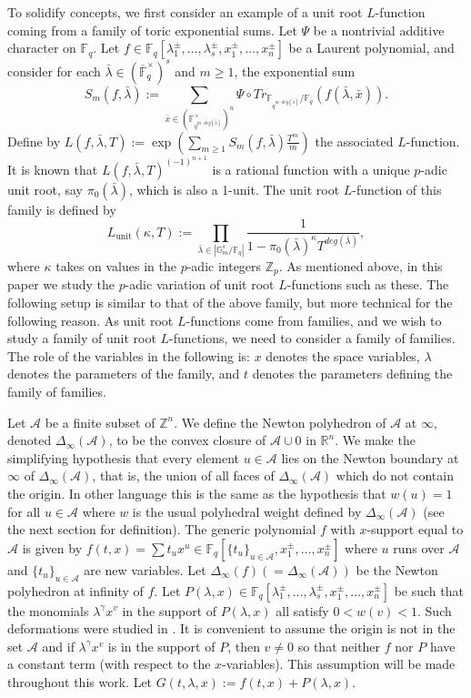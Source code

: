 \documentclass{article}
\theoremstyle{remark}
\def\bb #1{ {\mathbb #1} }
\def\c #1{ {\mathcal #1} }
\begin{document}
To solidify concepts, we first consider an example of a unit root $L$-function coming from a family of toric exponential sums. Let $\Psi$ be a nontrivial additive character on $\bb F_q$. Let $f \in \bb F_q[\lambda_1^\pm, \ldots, \lambda_s^\pm, x_1^\pm, \ldots, x_n^\pm]$ be a Laurent polynomial, and consider for each $\bar \lambda \in (\overline{\bb F}_q^\times)^s$ and $m \geq 1$, the exponential sum
\[
S_m(f, \bar \lambda) := \sum_{\bar x \in (\bb F_{q^{m \cdot deg(\bar \lambda)}}^\times)^n} \Psi\circ Tr_{\bb F_{q^{m \cdot deg(\bar \lambda)}} / \bb F_q}(f(\bar \lambda, \bar x)).
\]
Define by $L(f, \bar \lambda, T) := \exp( \sum_{m \geq 1} S_m(f, \bar \lambda) \frac{T^m}{m})$ the associated $L$-function. It is known that $L(f, \bar \lambda, T)^{(-1)^{n+1}}$ is a rational function with a unique $p$-adic unit root, say $\pi_0(\bar \lambda)$, which is also a 1-unit. The unit root $L$-function of this family is defined by
\[
L_\text{unit}(\kappa, T) := \prod_{\bar \lambda \in |\bb G_m^s / \bb F_q |} \frac{1}{1 - \pi_0(\bar \lambda)^\kappa T^{deg(\bar \lambda)}},
\]
where $\kappa$ takes on values in the $p$-adic integers $\bb Z_p$. As mentioned above, in this paper we study the $p$-adic variation of unit root $L$-functions such as these. The following setup is similar to that of the above family, but more technical for the following reason. As unit root $L$-functions come from families, and we wish to study a family of unit root $L$-functions, we need to consider a family of families. The role of the variables in the following is: $x$ denotes the space variables, $\lambda$ denotes the parameters of the family, and $t$ denotes the parameters defining the family of families.

Let $\c {A}$ be a finite subset of $\bb {Z}^n$.  We define the Newton polyhedron of $\c {A}$ at $\infty$, denoted $\Delta_{\infty}(\c {A})$, to be the convex closure of $\c {A} \cup {0}$ in $\bb {R}^n$. We make the simplifying hypothesis that every element $u \in \c {A}$ lies on the Newton boundary at $\infty$  of $\Delta_{\infty}(\c {A})$, that is, the union of all faces of $\Delta_{\infty}(\c {A})$ which do not contain the origin. In other language this is the same as the hypothesis that $w(u) = 1$ for all $u \in \c {A}$  where $w$ is the usual polyhedral weight defined by $\Delta_{\infty}(\c {A})$ (see the next section for definition). The generic polynomial $f$ with  $x$-support equal to $\c {A}$ is given by $f(t, x) = \sum t_u x^u  \in \bb F_q[\{ t_u\}_{u \in \c{A}}, x_1^\pm, \ldots, x_n^\pm]$ where $u$ runs over $ \c {A}$ and $\{t_u\}_{u \in \c {A}}$ are  new variables. Let  $\Delta_\infty(f) (= \Delta_{\infty}(\c {A}))$ be the Newton polyhedron at infinity of $f$.  Let $P(\lambda, x) \in \bb F_q[\lambda_1^\pm, \ldots, \lambda_s^\pm, x_1^\pm, \ldots, x_n^\pm]$ be such that the monomials $\lambda^{\gamma}x^v$ in the support of $P(\lambda, x)$ all satisfy $0 < w(v) < 1$.  Such deformations were studied in \cite{MR3239170}. It is convenient to assume the origin is not in the set  $\c {A}$ and if  $\lambda^{\gamma}x^v$ is in the support of $P$, then $v \neq 0$ so that neither $f$ nor $P$ have a constant term (with respect to the $x$-variables). This assumption will be made throughout this work. Let $G(t,\lambda, x):=f(t,x) + P(\lambda,x)$.
\end{document}
